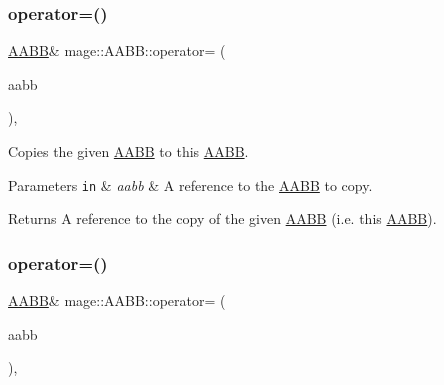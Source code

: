 \subsubsection{\texorpdfstring{operator=()}{operator=()}\hspace{0.1cm}{\footnotesize\ttfamily [1/2]}}
{\footnotesize\ttfamily \mbox{\hyperlink{classmage_1_1_a_a_b_b}{A\+A\+BB}}\& mage\+::\+A\+A\+B\+B\+::operator= (\begin{DoxyParamCaption}\item[{const \mbox{\hyperlink{classmage_1_1_a_a_b_b}{A\+A\+BB}} \&}]{aabb }\end{DoxyParamCaption})\hspace{0.3cm}{\ttfamily [default]}, {\ttfamily [noexcept]}}

Copies the given \mbox{\hyperlink{classmage_1_1_a_a_b_b}{A\+A\+BB}} to this \mbox{\hyperlink{classmage_1_1_a_a_b_b}{A\+A\+BB}}.


\begin{DoxyParams}[1]{Parameters}
\mbox{\tt in}  & {\em aabb} & A reference to the \mbox{\hyperlink{classmage_1_1_a_a_b_b}{A\+A\+BB}} to copy. \\
\hline
\end{DoxyParams}
\begin{DoxyReturn}{Returns}
A reference to the copy of the given \mbox{\hyperlink{classmage_1_1_a_a_b_b}{A\+A\+BB}} (i.\+e. this \mbox{\hyperlink{classmage_1_1_a_a_b_b}{A\+A\+BB}}). 
\end{DoxyReturn}
\mbox{\label{classmage_1_1_a_a_b_b_acc54304ce3bde3ea3aa2b487f2d975b7}} 
\subsubsection{\texorpdfstring{operator=()}{operator=()}\hspace{0.1cm}{\footnotesize\ttfamily [2/2]}}
{\footnotesize\ttfamily \mbox{\hyperlink{classmage_1_1_a_a_b_b}{A\+A\+BB}}\& mage\+::\+A\+A\+B\+B\+::operator= (\begin{DoxyParamCaption}\item[{\mbox{\hyperlink{classmage_1_1_a_a_b_b}{A\+A\+BB}} \&\&}]{aabb }\end{DoxyParamCaption})\hspace{0.3cm}{\ttfamily [default]}, {\ttfamily [noexcept]}}

